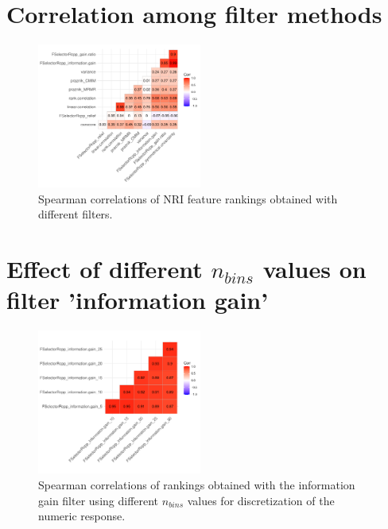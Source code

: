 \documentclass[journal]{IEEEtran}
\begin{document}
\section{Correlation among filter methods}

\begin{figure} [ht]
	\begin{center}
		\includegraphics[width=0.48\textwidth] {correlation-filter-nri-1.pdf}
		\caption{Spearman correlations of NRI feature rankings obtained with different filters.}\label{fig:correlation-filters}
	\end{center}
\end{figure}

\section{Effect of different \texorpdfstring{\(n_{bins}\)}{nbins} values on filter 'information gain'}

\begin{figure} [ht]
	\begin{center}
		\includegraphics[width=0.48\textwidth] {correlation-nbins-1.pdf}
		\caption{Spearman correlations of rankings obtained with the information gain filter using different \texttt{\(n_{bins}\)} values for discretization of the numeric response.}\label{fig:correlation-nbins}
	\end{center}
\end{figure}
\end{document}

